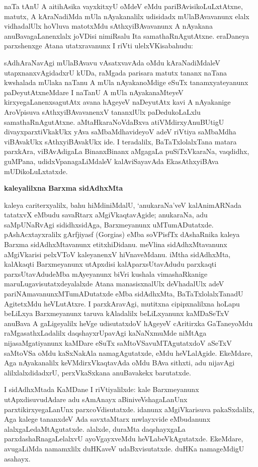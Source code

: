 naTa tAnU A aitihAsika vayxkitxyU oMdeV eMdu pariBAvisikoLuLxtAtxne, matutx, A kAraNadiMda mUla nAyakanalilx udisidadx mUlaBAvavanunx elalx vidhadalUlx hoVluva matotxMdu sAthxyiBAvavanunx A nAyakana anuBavagaLanenxlalx joVDisi nimiRsalu Ita samathaRnAgutAtxne. eraDaneya parxshenxge Atana utatxravanunx I riVti ulelxVKisabahudu:

sAdhAraNavAgi mUlaBAvavu vAsatxvavAda oMdu kAraNadiMdaleV utapxnanxvAgi\-dadxrU kUDa, raMgada parisara matutx tananx naTana kwshalada mUlaka naTanu A mUla nAyakanoMdige eSuTx tanamxyateyanunx paDeyutAtxneMdare I naTanU A mUla nAyakanaMteyeV kirxyegaLanenxsagutAtx avana hAgeyeV naDeyutAtx kavi A nAyakanige AroVpisuva sAthxyiBAvavanenxV tananxlUlx paDedukoLaLxlu samathaRnAgutAtxne. aMtaHkaraNoVdaBxva atiVMdirxyAnuBUtigU divayxparxtiVkakUkx yAva saMbaMdhavideyoV adeV riVtiya saMbaMdha viBAvakUkx sAthxyiBAvakUkx ide. I teradalilx, BaTaTxlolalxTana matara parxkAra, viBAvAdigaLa BinanxBinanx aMgagaLa puSiTxVkaraNa, vaqdidhx, guMPana, udidxVpanagaLiMdaleV kalAviSayavAda EkasAthxyiBAva mUDikoLuLxtatxde.

\smallskip
\begin{center}
{\Large\bf kaleyalilxna Barxma sidAdhxMta}
\end{center}

kaleya cariterxyalilx, bahu hiMdiniMdalU, `anukaraNa'veV kalAnimARNada tatatxvX eMbudu savaRtarx aMgiVkaqtavAgide; anukaraNa, adu saMpUNaRvAgi sididhxsidAga, Barxmeyanunx uMTumADutatxde. pAshAcxtayxralilx gArfjiyasf {\rm(Gorgias)} eMba soVPisfTx dAshaRnika kaleya Barxma sidAdhxMtavanunx etitxhiDidanu. meVlina sidAdhxMtavanunx aMgiVkarisi pelxVToV kaleyanenxV hiVnaveMdanu. iMtha sidAdhxMta, kalAkaqti Barxmeyanunx utApxdisi kalAparxsUtavAdudu parxkaqti parxsUtavAdudeMba mAyeyanunx biVri kushala vimashaRkanige maruLugavisutatxdeyalalxde Atana manasisxnalUlx deVhadalUlx adeV pariNAmavanunxMTumADutatxde eMba sidAdhxMta, BaTaTxlolalxTanadU AgitetxMdu heVLutAtxre. I parxkAravAgi, mutitxna cipipxnalilxna hoLapu beLiLxya Barxmeyanunx taruva kAladalilx beLiLxyanunx kaMDaSeTxV anuBava A gaLigeyalilx heVge udisutatxdoV hAgeyeV cAritirxka GaTaneyoMdu raMgasathxLadalilx daqshayxrUpavAgi kaNaNxmuMde niMtAga nijasaMgatiyanunx kaMDare eSuTx saMtoVSavuMTAgutatxdoV aSeTxV saMtoVSa oMdu kaSxNakAla namagAgutatxde, eMdu heVLalAgide. EkeMdare, Aga nAyakanalilx keVMdirxVkaqtavAda oMdu BAva sithxti, adu nijavAgi alilxlalxdidadxrU, perxVkaSxkana anuBavakekx barutatxde.

I sidAdhxMtada KaMDane I riVtiyalilxde: kale Barxmeyanunx utApxdisuvudAdare adu sAmAnayx aBiniveVshagaLanUnx parxtikirxyegaLanUnx parxcoVdisutatxde. idanunx aMgiVkarisuva pakaSxdalilx, Aga kalege tananxdeV Ada savxtaMtarx mwlayxvide eMbudanunx alalxgaLedaMtAgutatxde. alalxde, duraMta daqshayxgaLa parxdashaRnagaLelalxvU ayoVgayxveMdu heVLabeVkAgutatxde. EkeMdare, avugaLiMda namamxlilx duHKaveV udaBxvisutatxde. duHKa namageMdigU asahayx.

